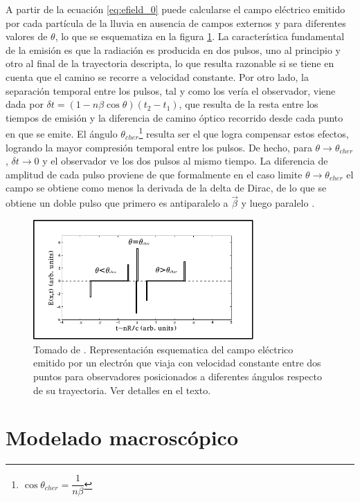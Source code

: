 	A partir de la ecuaci\'on \ref{eq:efield_0} puede calcularse el campo el\'ectrico emitido por cada part\'icula de la lluvia en ausencia de campos externos y para diferentes valores de $\theta$, lo que se esquematiza en la figura \ref{fig:zhs_pulse}.
	La caracter\'istica fundamental de la emisi\'on es que la radiaci\'on es producida en dos pulsos, uno al principio y otro al final de la trayectoria descripta, lo que resulta razonable si se tiene en cuenta que el camino se recorre a velocidad constante.
	Por otro lado, la separaci\'on temporal entre los pulsos, tal y como los ver\'ia el observador, viene dada por $\delta t = (1-n\beta\cos\theta)(t_2-t_1)$, que resulta de la resta entre los tiempos de emisi\'on y la diferencia de camino \'optico recorrido desde cada punto en que se emite.
	El \'angulo \cher{} $\theta_{cher}$\footnote{$\cos\theta_{cher}=\dfrac{1}{n\beta}$} resulta ser el que logra compensar estos efectos, logrando la mayor compresi\'on temporal entre los pulsos.
	De hecho, para $\theta\rightarrow\theta_{cher}$, $\delta t \rightarrow 0$ y el observador ve los dos pulsos al mismo tiempo.
	La diferencia de amplitud de cada pulso proviene de que formalmente en el caso limite $\theta\rightarrow\theta_{cher}$ el campo se obtiene como menos la derivada de la delta de Dirac, de lo que se obtiene un doble pulso que primero es antiparalelo a $\vec\beta$ y luego paralelo \cite{alvarez:2013}.
	\begin{figure}[ht!]
		\centering
		\includegraphics[width=0.75\textwidth]{fig/EASRadio/zhs_pulse}
		\caption{\label{fig:zhs_pulse} Tomado de \cite{alvarez:2013}. Representaci\'on esquematica del campo el\'ectrico emitido por un electr\'on que viaja con velocidad constante entre dos puntos para observadores posicionados a diferentes \'angulos respecto de su trayectoria. Ver detalles en el texto.}
	\end{figure}
	
	
\section{Modelado macrosc\'opico}
\label{sc:macroscopico}

